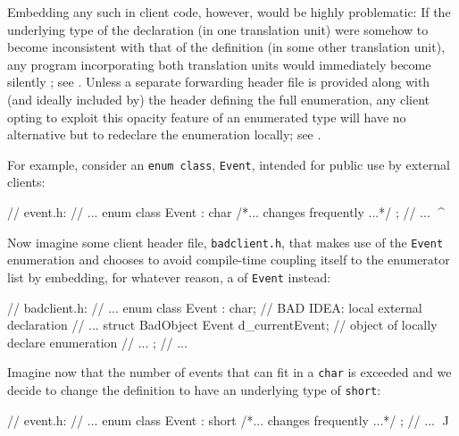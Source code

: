 Embedding any such  in client code, however,
would be highly problematic: If the underlying type of the declaration
(in one translation unit) were somehow to become inconsistent with that
of the definition (in some other translation unit), any program
incorporating both translation units would immediately become silently
; see . Unless a separate forwarding header file is
provided along with (and ideally included by) the header defining the
full enumeration, any client opting to exploit this
opacity feature of an enumerated type will have no alternative but to
redeclare the enumeration locally; see .

For example, consider an \lstinline!enum!~\lstinline!class!, \lstinline!Event!,
intended for public use by external clients:

\begin{emcppslisting}
// event.h:
// ...
enum class Event : char { /*... changes frequently ...*/ };
// ...             ^^^^
\end{emcppslisting}

\noindent Now imagine some client header file, \lstinline!badclient.h!, that makes
use of the \lstinline!Event! enumeration and chooses to avoid compile-time
coupling itself to the enumerator list by
embedding, for whatever reason, a  of \lstinline!Event! instead:

\begin{emcppslisting}
// badclient.h:
// ...
enum class Event : char;  // BAD IDEA: local external declaration
// ...
struct BadObject
{
    Event d_currentEvent;  // object of locally declare enumeration
    // ...
};
// ...
\end{emcppslisting}

\noindent Imagine now that the number of events that can fit in a \lstinline!char! is
exceeded and we decide to change the definition to have an underlying
type of \lstinline!short!:

\begin{emcppslisting}
// event.h:
// ...
enum class Event : short { /*... changes frequently ...*/ };
// ...             ^^^^^
\end{emcppslisting}


